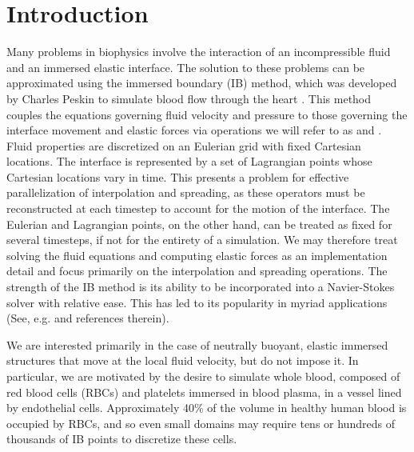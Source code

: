 \section{Introduction}

Many problems in biophysics involve the interaction of an incompressible fluid and an
immersed elastic interface. The solution to these problems can be approximated using the
immersed boundary (IB) method, which was developed by Charles Peskin to simulate blood
flow through the heart \cite{Peskin:1972wa}. This method couples the equations governing
fluid velocity and pressure to those governing the interface movement and elastic forces
via operations we will refer to as  and . Fluid
properties are discretized on an Eulerian grid with fixed Cartesian locations. The
interface is represented by a set of Lagrangian points whose Cartesian locations vary in
time. This presents a problem for effective parallelization of interpolation and
spreading, as these operators must be reconstructed at each timestep to account for the
motion of the interface. The Eulerian and Lagrangian points, on the other hand, can be
treated as fixed for several timesteps, if not for the entirety of a simulation. We may
therefore treat solving the fluid equations and computing elastic forces as an
implementation detail and focus primarily on the interpolation and spreading operations.
The strength of the IB method is its ability to be incorporated into a Navier-Stokes
solver with relative ease. This has led to its popularity in myriad applications (See,
e.g. \cite{Iaccarino:2005ii,Griffith:2020hi} and references therein).

We are interested primarily in the case of neutrally buoyant, elastic immersed structures
that move at the local fluid velocity, but do not impose it. In particular, we are
motivated by the desire to simulate whole blood, composed of red blood cells (RBCs) and
platelets immersed in blood plasma, in a vessel lined by endothelial cells. Approximately
40\% of the volume in healthy human blood is occupied by RBCs, and so even small domains
may require tens or hundreds of thousands of IB points to discretize these cells.

